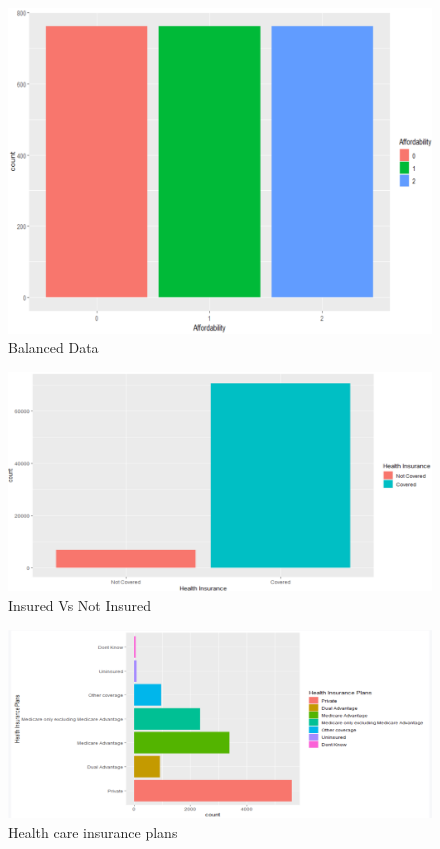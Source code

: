 \documentclass[12pt]{article}
\begin{document}
\begin{figure}[H]
\centering
\includegraphics[scale=0.5]{balanced.png}
\caption{Balanced Data}
\label{fig:databalance}
\end{figure}

\begin{figure}[H]
\centering
\includegraphics[scale=0.5]{insuredvsnot.png}
\caption{Insured Vs Not Insured}
\label{fig:insurance}
\end{figure}

\begin{figure}[H]
\centering
\includegraphics[scale=0.5]{privateplans.png}
\caption{Health care insurance plans}
\label{fig:privateplans}
\end{figure}
\end{document}
